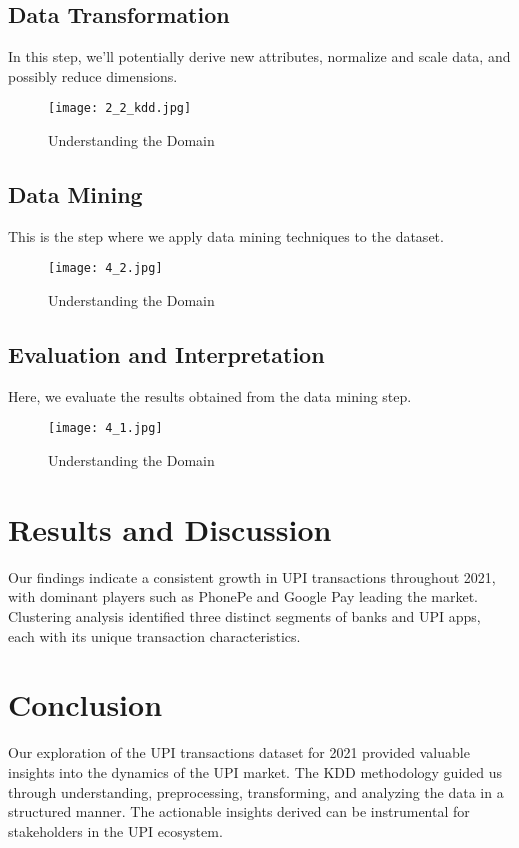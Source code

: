 \documentclass[12pt]{article}
\begin{document}
\subsection{Data Transformation}
In this step, we'll potentially derive new attributes, normalize and scale data, and possibly reduce dimensions.

\begin{figure}[H]
    \centering
    \texttt{[image: 2\_2\_kdd.jpg]}
    \caption{Understanding the Domain}
\end{figure}
\newpage
\subsection{Data Mining}
This is the step where we apply data mining techniques to the dataset.

\begin{figure}[H]
    \centering
    \texttt{[image: 4\_2.jpg]}
    \caption{Understanding the Domain}
\end{figure}

\subsection{Evaluation and Interpretation}
Here, we evaluate the results obtained from the data mining step.

\begin{figure}[H]
    \centering
    \texttt{[image: 4\_1.jpg]}
    \caption{Understanding the Domain}
\end{figure}

\section{Results and Discussion}

Our findings indicate a consistent growth in UPI transactions throughout 2021, with dominant players such as PhonePe and Google Pay leading the market. Clustering analysis identified three distinct segments of banks and UPI apps, each with its unique transaction characteristics.

\section{Conclusion}

Our exploration of the UPI transactions dataset for 2021 provided valuable insights into the dynamics of the UPI market. The KDD methodology guided us through understanding, preprocessing, transforming, and analyzing the data in a structured manner. The actionable insights derived can be instrumental for stakeholders in the UPI ecosystem.
\end{document}

